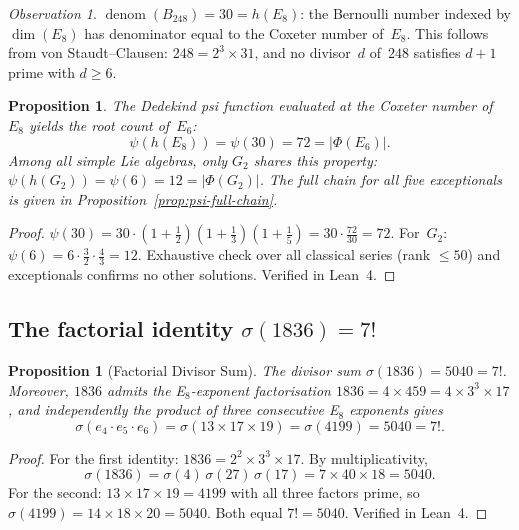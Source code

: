 \documentclass[11pt]{amsart}
\theoremstyle{plain}
\newtheorem{proposition}[theorem]{Proposition}
\theoremstyle{definition}
\theoremstyle{remark}
\newtheorem{observation}[theorem]{Observation}
\renewcommand{\Phi}{\varPhi}
\newcommand{\denom}{\operatorname{denom}}
\begin{document}
\begin{observation}\label{obs:B248}
$\denom(B_{248}) = 30 = h(E_8)$: the Bernoulli number indexed by
$\dim(E_8)$ has denominator equal to the Coxeter number of~$E_8$.
This follows from von Staudt--Clausen: $248 = 2^3 \times 31$,
and no divisor~$d$ of~$248$ satisfies $d + 1$ prime with $d \ge 6$.
\end{observation}

\begin{proposition}\label{prop:psi-coxeter}
The Dedekind psi function evaluated at the Coxeter number of~$E_8$
yields the root count of~$E_6$:
\[
  \psi(h(E_8)) = \psi(30) = 72 = |\Phi(E_6)|.
\]
Among all simple Lie algebras, only $G_2$ shares this property:
$\psi(h(G_2)) = \psi(6) = 12 = |\Phi(G_2)|$.
The full chain for all five exceptionals is given in
Proposition~\ref{prop:psi-full-chain}.
\end{proposition}

\begin{proof}
$\psi(30) = 30 \cdot (1+\tfrac{1}{2})(1+\tfrac{1}{3})(1+\tfrac{1}{5})
= 30 \cdot \tfrac{72}{30} = 72$.  For~$G_2$:
$\psi(6) = 6 \cdot \tfrac{3}{2} \cdot \tfrac{4}{3} = 12$.
Exhaustive check over all classical series (rank $\le 50$) and
exceptionals confirms no other solutions.  Verified in Lean~4.
\end{proof}

\subsection{The factorial identity $\sigma(1836) = 7!$}

\begin{proposition}[Factorial Divisor Sum]\label{prop:sigma-factorial}
The divisor sum $\sigma(1836) = 5040 = 7!$.  Moreover, $1836$ admits the
E$_8$-exponent factorisation $1836 = 4 \times 459 = 4 \times 3^3 \times 17$,
and independently the product of three consecutive E$_8$ exponents gives
\[
  \sigma(e_4 \cdot e_5 \cdot e_6) = \sigma(13 \times 17 \times 19) = \sigma(4199) = 5040 = 7!.
\]
\end{proposition}

\begin{proof}
For the first identity: $1836 = 2^2 \times 3^3 \times 17$.  By
multiplicativity,
\[
  \sigma(1836) = \sigma(4)\,\sigma(27)\,\sigma(17) = 7 \times 40 \times 18 = 5040.
\]
For the second: $13 \times 17 \times 19 = 4199$ with all three factors
prime, so $\sigma(4199) = 14 \times 18 \times 20 = 5040$.
Both equal $7! = 5040$.  Verified in Lean~4.
\end{proof}
\end{document}
